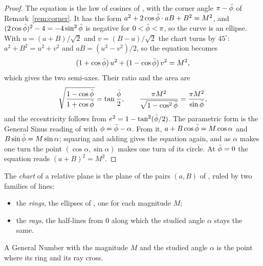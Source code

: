 \begin{proof}
The equation is the law of cosines of , with the corner angle $\pi - \bar{\phi}$ of Remark~\ref{rem:corner}. It has the form $a^2 + 2\cos\bar{\phi} \cdot aB + B^2 = M^2$, and $(2\cos\bar{\phi})^2 - 4 = -4\sin^2\bar{\phi}$ is negative for $0 < \bar{\phi} < \pi$, so the curve is an ellipse. With $u = (a + B)/\sqrt{2}$ and $v = (B - a)/\sqrt{2}$ the chart turns by $45^\circ$: $a^2 + B^2 = u^2 + v^2$ and $aB = (u^2 - v^2)/2$, so the equation becomes
\[
(1 + \cos\bar{\phi})\,u^2 + (1 - \cos\bar{\phi})\,v^2 = M^2 ,
\]
which gives the two semi-axes. Their ratio and the area are
\[
\sqrt{\frac{1 - \cos\bar{\phi}}{1 + \cos\bar{\phi}}} = \tan\frac{\bar{\phi}}{2}, \qquad \frac{\pi M^2}{\sqrt{1 - \cos^2\bar{\phi}}} = \frac{\pi M^2}{\sin\bar{\phi}} ,
\]
and the eccentricity follows from $e^2 = 1 - \tan^2(\bar{\phi}/2)$. The parametric form is the General Sinus reading of  with $\phi = \bar{\phi} - \alpha$. From it, $a + B\cos\bar{\phi} = M\cos\alpha$ and $B\sin\bar{\phi} = M\sin\alpha$; squaring and adding gives the equation again, and as $\alpha$ makes one turn the point $(\cos\alpha, \sin\alpha)$ makes one turn of its circle. At $\bar{\phi} = 0$ the equation reads $(a + B)^2 = M^2$.
\end{proof}

\begin{definition}\label{def:rings-rays}
The \emph{chart} of a relative plane is the plane of the pairs $(a, B)$ of , ruled by two families of lines:
\begin{itemize}
  \item the \emph{rings}, the ellipses of , one for each magnitude $M$;
  \item the \emph{rays}, the half-lines from $0$ along which the studied angle $\alpha$ stays the same.
\end{itemize}
A General Number with the magnitude $M$ and the studied angle $\alpha$ is the point where its ring and its ray cross.
\end{definition}

